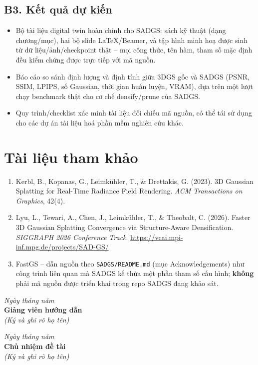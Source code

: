 \documentclass[a4paper,12pt]{article}
\begin{document}
\subsection*{B3. Kết quả dự kiến}
\begin{itemize}[leftmargin=1.2em]
\item Bộ tài liệu digital twin hoàn chỉnh cho SADGS: sách kỹ thuật (dạng chương/mục), hai bộ
slide LaTeX/Beamer, và tập hình minh hoạ được sinh từ dữ liệu/ảnh/checkpoint thật -- mọi công
thức, tên hàm, tham số mặc định đều kiểm chứng được trực tiếp với mã nguồn.
\item Báo cáo so sánh định lượng và định tính giữa 3DGS gốc và SADGS (PSNR, SSIM, LPIPS, số
Gaussian, thời gian huấn luyện, VRAM), dựa trên một lượt chạy benchmark thật cho cơ chế
densify/prune của SADGS.
\item Quy trình/checklist xác minh tài liệu đối chiếu mã nguồn, có thể tái sử dụng cho các dự án
tài liệu hoá phần mềm nghiên cứu khác.
\end{itemize}

\section*{Tài liệu tham khảo}
\begin{enumerate}[leftmargin=1.4em]
\item Kerbl, B., Kopanas, G., Leimkühler, T., \& Drettakis, G. (2023). 3D Gaussian Splatting for
Real-Time Radiance Field Rendering. \textit{ACM Transactions on Graphics}, 42(4).
\item Lyu, L., Tewari, A., Chen, J., Leimkühler, T., \& Theobalt, C. (2026). Faster 3D Gaussian
Splatting Convergence via Structure-Aware Densification. \textit{SIGGRAPH 2026 Conference
Track}. \url{https://vcai.mpi-inf.mpg.de/projects/SAD-GS/}
\item FastGS -- dẫn nguồn theo \texttt{SADGS/README.md} (mục Acknowledgements) như công trình
liên quan mà SADGS kế thừa một phần tham số cấu hình; \textbf{không} phải mã nguồn được triển
khai trong repo SADGS đang khảo sát.
\end{enumerate}

\vspace{1.2cm}
\begin{minipage}{0.48\textwidth}
\centering
\textit{Ngày \phantom{00} tháng \phantom{00} năm \phantom{0000}}\\
\textbf{Giảng viên hướng dẫn}\\
\textit{(Ký và ghi rõ họ tên)}
\vspace{1.6cm}
\end{minipage}
\hfill
\begin{minipage}{0.48\textwidth}
\centering
\textit{Ngày \phantom{00} tháng \phantom{00} năm \phantom{0000}}\\
\textbf{Chủ nhiệm đề tài}\\
\textit{(Ký và ghi rõ họ tên)}
\vspace{1.6cm}
\end{minipage}
\end{document}

